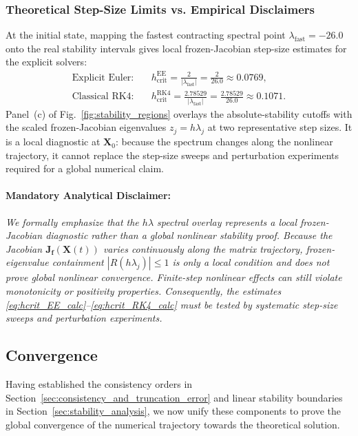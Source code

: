 \documentclass[11pt,a4paper]{article}
\theoremstyle{definition}
\theoremstyle{remark}
\begin{document}
\subsubsection{Theoretical Step-Size Limits vs. Empirical Disclaimers}
At the initial state, mapping the fastest contracting spectral point $\lambda_{\mathrm{fast}}=-26.0$ onto the real stability intervals gives local frozen-Jacobian step-size estimates for the explicit solvers:
\begin{align}
\text{Explicit Euler:} \quad & h_{\mathrm{crit}}^{\mathrm{EE}} = \frac{2}{|\lambda_{\mathrm{fast}}|} = \frac{2}{26.0} \approx 0.0769, \label{eq:hcrit_EE_calc} \\
\text{Classical RK4:} \quad & h_{\mathrm{crit}}^{\mathrm{RK4}} = \frac{2.78529}{|\lambda_{\mathrm{fast}}|} = \frac{2.78529}{26.0} \approx 0.1071. \label{eq:hcrit_RK4_calc}
\end{align}
Panel~(c) of Fig.~\ref{fig:stability_regions} overlays the absolute-stability cutoffs with the scaled frozen-Jacobian eigenvalues $z_j=h\lambda_j$ at two representative step sizes. It is a local diagnostic at $\mathbf{X}_0$: because the spectrum changes along the nonlinear trajectory, it cannot replace the step-size sweeps and perturbation experiments required for a global numerical claim.

\paragraph{Mandatory Analytical Disclaimer:}
\emph{We formally emphasize that the $h\lambda$ spectral overlay represents a local frozen-Jacobian diagnostic rather than a global nonlinear stability proof. Because the Jacobian $\mathbf{J}_{\mathbf{f}}(\mathbf{X}(t))$ varies continuously along the matrix trajectory, frozen-eigenvalue containment $|R(h\lambda_j)| \le 1$ is only a local condition and does not prove global nonlinear convergence. Finite-step nonlinear effects can still violate monotonicity or positivity properties. Consequently, the estimates \eqref{eq:hcrit_EE_calc}--\eqref{eq:hcrit_RK4_calc} must be tested by systematic step-size sweeps and perturbation experiments.}

\subsection{Convergence}

\label{sec:convergence}

Having established the consistency orders in Section~\ref{sec:consistency_and_truncation_error} and linear stability boundaries in Section~\ref{sec:stability_analysis}, we now unify these components to prove the global convergence of the numerical trajectory towards the theoretical solution.
\end{document}
